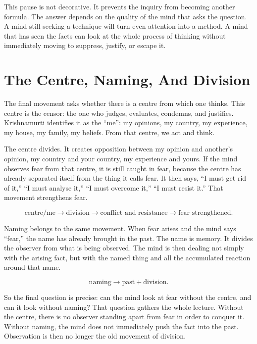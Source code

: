 This pause is not decorative. It prevents the inquiry from becoming another formula. The answer depends on the quality of the mind that asks the question. A mind still seeking a technique will turn even attention into a method. A mind that has seen the facts can look at the whole process of thinking without immediately moving to suppress, justify, or escape it.

\section{The Centre, Naming, And Division}

The final movement asks whether there is a centre from which one thinks. This centre is the censor: the one who judges, evaluates, condemns, and justifies. Krishnamurti identifies it as the ``me'': my opinions, my country, my experience, my house, my family, my beliefs. From that centre, we act and think.

The centre divides. It creates opposition between my opinion and another's opinion, my country and your country, my experience and yours. If the mind observes fear from that centre, it is still caught in fear, because the centre has already separated itself from the thing it calls fear. It then says, ``I must get rid of it,'' ``I must analyse it,'' ``I must overcome it,'' ``I must resist it.'' That movement strengthens fear.

\begin{equation}
\text{centre/me}
\longrightarrow
\text{division}
\longrightarrow
\text{conflict and resistance}
\longrightarrow
\text{fear strengthened}.
\end{equation}

Naming belongs to the same movement. When fear arises and the mind says ``fear,'' the name has already brought in the past. The name is memory. It divides the observer from what is being observed. The mind is then dealing not simply with the arising fact, but with the named thing and all the accumulated reaction around that name.

\begin{equation}
\text{naming}
\longrightarrow
\text{past} + \text{division}.
\end{equation}

So the final question is precise: can the mind look at fear without the centre, and can it look without naming? That question gathers the whole lecture. Without the centre, there is no observer standing apart from fear in order to conquer it. Without naming, the mind does not immediately push the fact into the past. Observation is then no longer the old movement of division.

